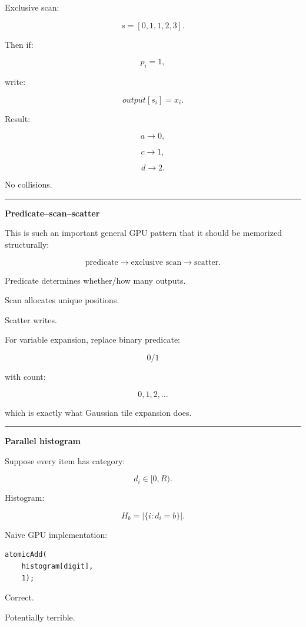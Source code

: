 Exclusive scan:

\[
s=
[0,1,1,2,3].
\]

Then if:

\[
p_i=1,
\]

write:

\[
\boxed{
output[s_i]=x_i.
}
\]

Result:

\[
a\rightarrow0,
\]

\[
c\rightarrow1,
\]

\[
d\rightarrow2.
\]

No collisions.

\begin{center}\rule{0.5\linewidth}{0.5pt}\end{center}

\textbf{Predicate--scan--scatter}

This is such an important general GPU pattern that it should be memorized structurally:

\[
\boxed{
\text{predicate}
\rightarrow
\text{exclusive scan}
\rightarrow
\text{scatter}.
}
\]

Predicate determines whether/how many outputs.

Scan allocates unique positions.

Scatter writes.

For variable expansion, replace binary predicate:

\[
0/1
\]

with count:

\[
0,1,2,\dots
\]

which is exactly what Gaussian tile expansion does.

\begin{center}\rule{0.5\linewidth}{0.5pt}\end{center}

\textbf{Parallel histogram}

Suppose every item has category:

\[
d_i\in[0,R).
\]

Histogram:

\[
H_b=
|\{i:d_i=b\}|.
\]

Naive GPU implementation:

\protect{}\label{mdso8e}%
\begin{verbatim}
atomicAdd(
    histogram[digit],
    1);
\end{verbatim}

Correct.

Potentially terrible.

